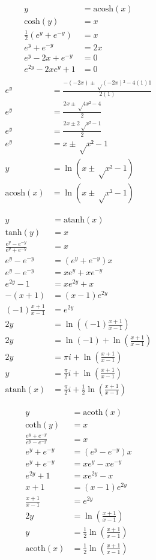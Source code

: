 \documentclass[10pt]{article}
\begin{document}
\begin{multicols}{2}
\begin{align*}
    y &= \mathrm{acosh}(x) \\
    \mathrm{cosh}(y) &= x \\
    \frac{1}{2} (e^y + e^{-y}) &= x \\
    e^y + e^{-y} &= 2x \\
    e^y - 2x + e^{-y} &= 0 \\
    e^{2y} - 2x e^y + 1 &= 0 \\
\end{align*}
\begin{align*}
    e^y &= \frac{ -(-2x) ± √{(-2x)² - 4(1)1} }{2(1)} \\
    e^y &= \frac{ 2x ± √{4x² - 4} }{2} \\
    e^y &= \frac{ 2x ± 2 √{x² - 1} }{2} \\
    e^y &= x ± √{x² - 1} \\
    y &= \ln(x ± √{x² - 1}) \\
    \mathrm{acosh}(x) &= \ln(x ± √{x² - 1})
\end{align*}

\begin{align*}
    y &= \mathrm{atanh}(x) \\
    \mathrm{tanh}(y) &= x \\
    \frac{e^y - e^{-y}}{e^y + e^{-y}} &= x \\
    e^y - e^{-y} &= (e^y + e^{-y}) x \\
    e^y - e^{-y} &= x e^y + x e^{-y} \\
    e^{2y} - 1 &= x e^{2y} + x \\
    - (x + 1) &= (x - 1) e^{2y} \\
    (-1) \frac{x + 1}{x - 1} &= e^{2y} \\
    2y &= \ln((-1) \frac{x + 1}{x - 1}) \\
    2y &= \ln(-1) + \ln(\frac{x + 1}{x - 1}) \\
    2y &= π i + \ln(\frac{x + 1}{x - 1}) \\
    y &= \frac{π}{2} i + \ln(\frac{x + 1}{x - 1}) \\
    \mathrm{atanh}(x) &= \frac{π}{2} i + \frac{1}{2} \ln(\frac{x + 1}{x - 1})
\end{align*}

\begin{align*}
    y &= \mathrm{acoth}(x) \\
    \mathrm{coth}(y) &= x \\
    \frac{e^y + e^{-y}}{e^y - e^{-y}} &= x \\
    e^y + e^{-y} &= (e^y - e^{-y}) x \\
    e^y + e^{-y} &= x e^y - x e^{-y} \\
    e^{2y} + 1 &= x e^{2y} - x \\
    x + 1 &= (x - 1) e^{2y} \\
    \frac{x + 1}{x - 1} &= e^{2y} \\
    2y &= \ln(\frac{x + 1}{x - 1}) \\
    y &= \frac{1}{2} \ln(\frac{x + 1}{x - 1}) \\
    \mathrm{acoth}(x) &= \frac{1}{2} \ln(\frac{x + 1}{x - 1})
\end{align*}


\end{multicols}
\end{document}
